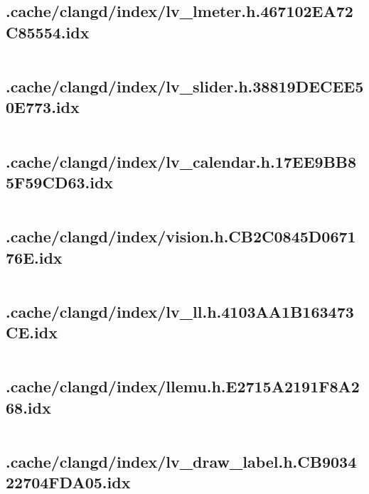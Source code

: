 \subsection{.cache/clangd/index/lv_lmeter.h.467102EA72C85554.idx}
\inputminted[linenos,tabsize=2,breaklines, breakanywhere]{c}{lv_lmeter.h.467102EA72C85554.idx}
\pagebreak

\subsection{.cache/clangd/index/lv_slider.h.38819DECEE50E773.idx}
\inputminted[linenos,tabsize=2,breaklines, breakanywhere]{c}{lv_slider.h.38819DECEE50E773.idx}
\pagebreak

\subsection{.cache/clangd/index/lv_calendar.h.17EE9BB85F59CD63.idx}
\inputminted[linenos,tabsize=2,breaklines, breakanywhere]{c}{lv_calendar.h.17EE9BB85F59CD63.idx}
\pagebreak

\subsection{.cache/clangd/index/vision.h.CB2C0845D067176E.idx}
\inputminted[linenos,tabsize=2,breaklines, breakanywhere]{c}{vision.h.CB2C0845D067176E.idx}
\pagebreak

\subsection{.cache/clangd/index/lv_ll.h.4103AA1B163473CE.idx}
\inputminted[linenos,tabsize=2,breaklines, breakanywhere]{c}{lv_ll.h.4103AA1B163473CE.idx}
\pagebreak

\subsection{.cache/clangd/index/llemu.h.E2715A2191F8A268.idx}
\inputminted[linenos,tabsize=2,breaklines, breakanywhere]{c}{llemu.h.E2715A2191F8A268.idx}
\pagebreak

\subsection{.cache/clangd/index/lv_draw_label.h.CB903422704FDA05.idx}
\inputminted[linenos,tabsize=2,breaklines, breakanywhere]{c}{lv_draw_label.h.CB903422704FDA05.idx}
\pagebreak


